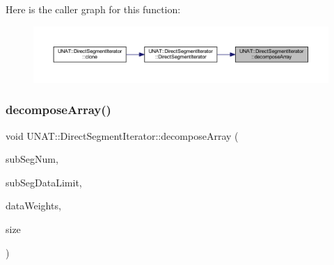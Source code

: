 Here is the caller graph for this function\+:
\nopagebreak
\begin{figure}[H]
\begin{center}
\leavevmode
\includegraphics[width=350pt]{classUNAT_1_1DirectSegmentIterator_abe078eae31fdecd5a4b4adf4fb96a663_icgraph}
\end{center}
\end{figure}
\mbox{\label{classUNAT_1_1DirectSegmentIterator_abe078eae31fdecd5a4b4adf4fb96a663}} 
\subsubsection{\texorpdfstring{decomposeArray()}{decomposeArray()}\hspace{0.1cm}{\footnotesize\ttfamily [2/2]}}
{\footnotesize\ttfamily void U\+N\+A\+T\+::\+Direct\+Segment\+Iterator\+::decompose\+Array (\begin{DoxyParamCaption}\item[{\mbox{\hyperlink{include_2swMacro_8h_a113cf5f6b5377cdf3fac6aa4e443e9aa}{sw\+Int}}}]{sub\+Seg\+Num,  }\item[{\mbox{\hyperlink{include_2swMacro_8h_a113cf5f6b5377cdf3fac6aa4e443e9aa}{sw\+Int}}}]{sub\+Seg\+Data\+Limit,  }\item[{\mbox{\hyperlink{include_2swMacro_8h_a113cf5f6b5377cdf3fac6aa4e443e9aa}{sw\+Int}} $\ast$}]{data\+Weights,  }\item[{\mbox{\hyperlink{include_2swMacro_8h_a113cf5f6b5377cdf3fac6aa4e443e9aa}{sw\+Int}}}]{size }\end{DoxyParamCaption})\hspace{0.3cm}{\ttfamily [private]}}

\mbox{\label{classUNAT_1_1DirectSegmentIterator_af7c69ced9c4c68aab3f8be3bdbbb39c4}} 
